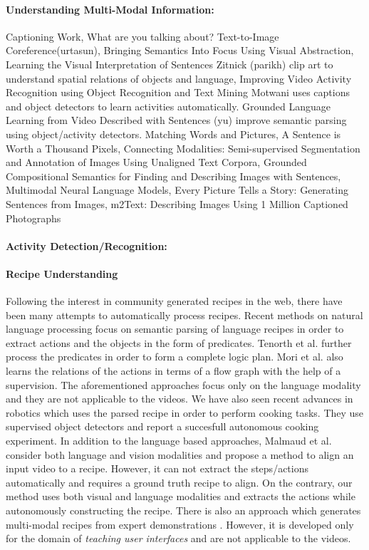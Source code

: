 \paragraph{Understanding Multi-Modal Information:} Captioning Work, What are you talking about? Text-to-Image Coreference(urtasun), Bringing Semantics Into Focus Using Visual Abstraction, Learning the Visual Interpretation of Sentences Zitnick (parikh) clip art to understand spatial relations of objects and language, Improving Video Activity Recognition using Object Recognition and Text Mining Motwani uses captions and object detectors to learn activities automatically. Grounded Language Learning from Video Described with Sentences (yu) improve semantic parsing using object/activity detectors. Matching Words and Pictures, A Sentence is Worth a Thousand Pixels, Connecting Modalities: Semi-supervised Segmentation and Annotation of
Images Using Unaligned Text Corpora, Grounded Compositional Semantics
for Finding and Describing Images with Sentences, Multimodal Neural Language Models, Every Picture Tells a Story: Generating Sentences from Images, m2Text: Describing Images Using 1 Million
Captioned Photographs

\paragraph{Activity Detection/Recognition:}

\paragraph{Recipe Understanding}
Following the interest in community generated recipes in the web, there have been many attempts to automatically process recipes. Recent methods on natural language processing \cite{cookingSemantics,logicRecipe} focus on semantic parsing of language recipes in order to extract actions and the objects in the form of predicates. Tenorth et al.\cite{logicRecipe} further process the predicates in order to form a complete logic plan. Mori et al.\cite{flowGraph} also learns the relations of the actions in terms of a flow graph with the help of a supervision. The aforementioned approaches focus only on the language modality and they are not applicable to the videos. We have also seen recent advances \cite{beetz,cookie} in robotics which uses the parsed recipe in order to perform cooking tasks. They use supervised object detectors and report a succesfull autonomous cooking experiment. In addition to the language based approaches, Malmaud et al.\cite{alignment} consider both language and vision modalities and propose a method to align an input video to a recipe. However, it can not extract the steps/actions automatically and requires a ground truth recipe to align. On the contrary, our method uses both visual and language modalities and extracts the actions while autonomously constructing the recipe. There is also an approach which generates multi-modal recipes from expert demonstrations \cite{photoshop}. However, it is developed only for the domain of \emph{teaching user interfaces} and are not applicable to the videos.
